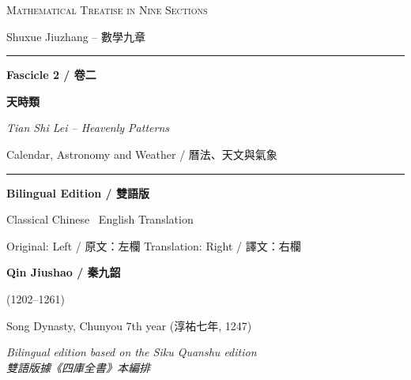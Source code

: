 \documentclass[11pt,a4paper]{article}
\newcommand{\longline}{\noindent\rule{\textwidth}{0.4pt}}
\begin{document}
\begin{titlepage}
\begin{center}
\vspace*{1.5cm}

{\fontsize{26}{32}\selectfont\color{titlecolor}
\textsc{Mathematical Treatise in Nine Sections}}

\vspace{0.6cm}

{\fontsize{16}{20}\selectfont\color{sectioncolor}
Shuxue Jiuzhang -- 數學九章}

\vspace{1.2cm}

\longline

\vspace{1.2cm}

{\fontsize{32}{38}\selectfont\color{headcolor}
\textbf{Fascicle 2 / 卷二}}

\vspace{0.4cm}

{\fontsize{22}{28}\selectfont\color{sectioncolor}
\textbf{天時類}}

\vspace{0.3cm}

{\Large\textit{Tian Shi Lei -- Heavenly Patterns}}

\vspace{0.3cm}

{\large\color{notecolor}Calendar, Astronomy and Weather / 曆法、天文與氣象}

\vspace{1.2cm}

\longline

\vspace{1cm}

{\Large\textbf{Bilingual Edition / 雙語版}}

\vspace{0.5cm}

{\large\color{notecolor}Classical Chinese \textbullet\ English Translation}

\vspace{0.5cm}

{\small Original: Left / 原文：左欄 \quad Translation: Right / 譯文：右欄}

\vspace{1.2cm}

{\Large\textbf{Qin Jiushao / 秦九韶}}

\vspace{0.2cm}

{\large (1202--1261)}

\vspace{0.4cm}

{\normalsize\color{notecolor} Song Dynasty, Chunyou 7th year (淳祐七年, 1247)}

\vfill

{\small\color{sectioncolor}
\textit{Bilingual edition based on the Siku Quanshu edition\\
雙語版據《四庫全書》本編排}}

\end{center}
\end{titlepage}
\end{document}
